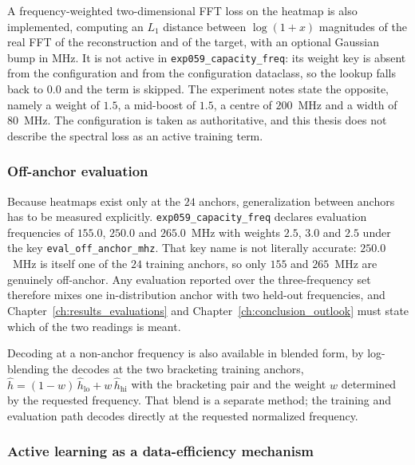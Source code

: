 A frequency-weighted two-dimensional FFT loss on the heatmap is also implemented,
computing an $L_1$ distance between $\log(1+x)$ magnitudes of the real FFT of the
reconstruction and of the target, with an optional Gaussian bump in MHz. It is
not active in \texttt{exp059\_capacity\_freq}: its weight key is absent from the
configuration and from the configuration dataclass, so the lookup falls back to
$0.0$ and the term is skipped. The experiment notes state the opposite, namely a
weight of $1.5$, a mid-boost of $1.5$, a centre of $200$~MHz and a width of
$80$~MHz. The configuration is taken as authoritative, and this thesis does not
describe the spectral loss as an active training term.

\subsubsection*{Off-anchor evaluation}

Because heatmaps exist only at the $24$ anchors, generalization between anchors
has to be measured explicitly. \texttt{exp059\_capacity\_freq} declares
evaluation frequencies of $155.0$, $250.0$ and $265.0$~MHz with weights $2.5$,
$3.0$ and $2.5$ under the key \texttt{eval\_off\_anchor\_mhz}. That key name is
not literally accurate: $250.0$~MHz is itself one of the $24$ training anchors,
so only $155$ and $265$~MHz are genuinely off-anchor. Any evaluation reported
over the three-frequency set therefore mixes one in-distribution anchor with two
held-out frequencies, and Chapter~\ref{ch:results_evaluations} and
Chapter~\ref{ch:conclusion_outlook} must state which of the two readings is
meant.

Decoding at a non-anchor frequency is also available in blended form, by
log-blending the decodes at the two bracketing training anchors,
$\hat{h} = (1-w)\,\hat{h}_{\mathrm{lo}} + w\,\hat{h}_{\mathrm{hi}}$ with the
bracketing pair and the weight $w$ determined by the requested frequency. That
blend is a separate method; the training and evaluation path decodes directly at
the requested normalized frequency.

\subsubsection*{Active learning as a data-efficiency mechanism}

